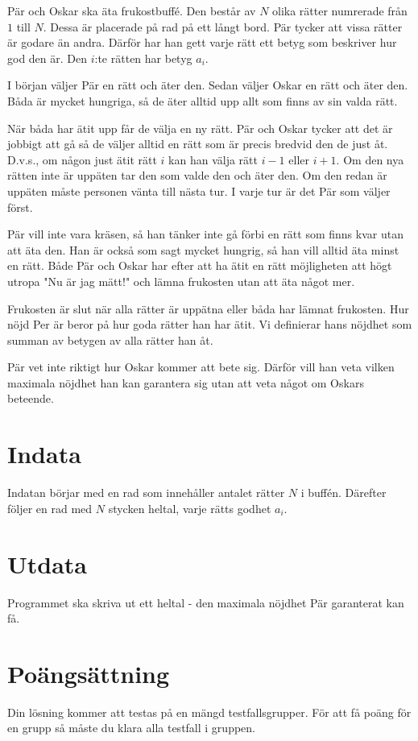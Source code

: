 Pär och Oskar ska äta frukostbuffé.
Den består av $N$ olika rätter numrerade från $1$ till $N$.
Dessa är placerade på rad på ett långt bord.
Pär tycker att vissa rätter är godare än andra.
Därför har han gett varje rätt ett betyg som beskriver hur god den är.
Den $i$:te rätten har betyg $a_i$.

I början väljer Pär en rätt och äter den. Sedan väljer Oskar en rätt och äter den.
Båda är mycket hungriga, så de äter alltid upp allt som finns av sin valda rätt.

När båda har ätit upp får de välja en ny rätt.
Pär och Oskar tycker att det är jobbigt att gå så de väljer alltid en rätt som är precis bredvid den de just åt.
D.v.s., om någon just ätit rätt $i$ kan han välja rätt $i-1$ eller $i+1$.
Om den nya rätten inte är uppäten tar den som valde den och äter den.
Om den redan är uppäten måste personen vänta till nästa tur.
I varje tur är det Pär som väljer först.

Pär vill inte vara kräsen, så han tänker inte gå förbi en rätt som finns kvar utan att äta den.
Han är också som sagt mycket hungrig, så han vill alltid äta minst en rätt.
Både Pär och Oskar har efter att ha ätit en rätt möjligheten att högt utropa "Nu är jag mätt!" och lämna frukosten utan att äta något mer.

Frukosten är slut när alla rätter är uppätna eller båda har lämnat frukosten.
Hur nöjd Per är beror på hur goda rätter han har ätit.
Vi definierar hans nöjdhet som summan av betygen av alla rätter han åt.

Pär vet inte riktigt hur Oskar kommer att bete sig.
Därför vill han veta vilken maximala nöjdhet han kan garantera sig utan att veta något om Oskars beteende.

\section*{Indata}
Indatan börjar med en rad som innehåller antalet rätter $N$ i buffén.
Därefter följer en rad med $N$ stycken heltal, varje rätts godhet $a_i$.

\section*{Utdata}
Programmet ska skriva ut ett heltal - den maximala nöjdhet Pär garanterat kan få.

\section*{Poängsättning}
Din lösning kommer att testas på en mängd testfallsgrupper. För att få poäng för en grupp så måste du klara alla testfall i gruppen.

